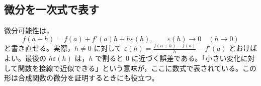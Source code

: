 \subsection{微分を一次式で表す}
微分可能性は，
\[
 f(a+h)=f(a)+f'(a)h+h\varepsilon(h),
 \qquad \varepsilon(h)\to0\quad(h\to0)
\]
と書き直せる。実際，$h\ne0$ に対して $\varepsilon(h)=\frac{f(a+h)-f(a)}h-f'(a)$ とおけばよい。最後の $h\varepsilon(h)$ は，$h$ で割ると $0$ に近づく誤差である。「小さい変化に対して関数を接線で近似できる」という意味が，ここに数式で表されている。この形は合成関数の微分を証明するときにも役立つ。

